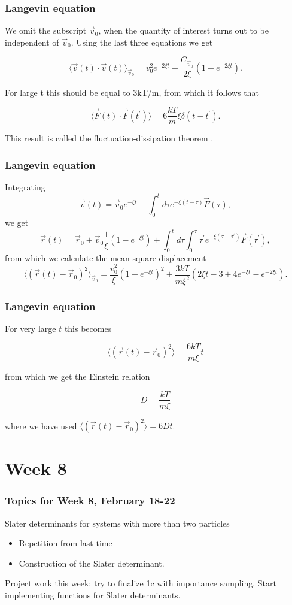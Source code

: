 \frame
{
  \frametitle{Langevin equation}
\begin{small}
{\scriptsize
We omit the subscript $\vec{v}_{0}$, when the quantity of interest turns out to be independent of $\vec{v}_{0}$. Using the last three equations we get

 \[
\langle \vec{v}(t)\cdot \vec{v}(t)\rangle_{\vec{v}_{0}}=v_{0}^{2}e^{-2\xi t}+\frac{C_{\vec{v}_{0}}}{2\xi }(1-e^{-2\xi t}).\]

For large t this should be equal to 3kT/m, from which it follows that

\[
\langle \vec{F}(t)\cdot \vec{F}(t^{\prime })\rangle =6\frac{kT}{m}\xi \delta (t-t^{\prime }). \]

This result is called the fluctuation-dissipation theorem .
}
\end{small}
}
\frame
{
  \frametitle{Langevin equation}
\begin{small}
{\scriptsize
Integrating 
 \[ 
\vec{v}(t)=\vec{v}_{0}e^{-\xi t}+\int_{0}^{t}d\tau e^{-\xi (t-\tau )}\vec{F }(\tau ), \] 
we get
\[
\vec{r}(t)=\vec{r}_{0}+\vec{v}_{0}\frac{1}{\xi }(1-e^{-\xi t})+
\int_0^td\tau \int_0^{\tau}\tau ^{\prime } e^{-\xi (\tau -\tau ^{\prime })}\vec{F}(\tau ^{\prime }), \]
from which we calculate the mean square displacement 
\[
\langle ( \vec{r}(t)-\vec{r}_{0})^{2}\rangle _{\vec{v}_{0}}=\frac{v_0^2}{\xi}(1-e^{-\xi t})^{2}+\frac{3kT}{m\xi ^{2}}(2\xi t-3+4e^{-\xi t}-e^{-2\xi t}). \]
}
\end{small}
}
\frame
{
  \frametitle{Langevin equation}
\begin{small}
{\scriptsize
For very large $t$ this becomes

\[
\langle (\vec{r}(t)-\vec{r}_{0})^{2}\rangle =\frac{6kT}{m\xi }t \] 

from which we get the Einstein relation  

 \[ D= \frac{kT}{m\xi } \] 	

where we have used $\langle (\vec{r}(t)-\vec{r}_{0})^{2}\rangle =6Dt$.
}
\end{small}
}


\section[Week 8]{Week 8}
\frame
{
  \frametitle{Topics for Week 8, February 18-22}
  \begin{block}{Slater determinants for systems with more than two particles}
\begin{itemize}
\item Repetition from last time
\item Construction of the Slater determinant.
\end{itemize}
Project work this week: try to finalize 1c with importance sampling.  Start implementing functions for Slater determinants.
  \end{block}
} 

